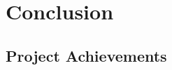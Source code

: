 \chapter{Conclusion}
\label{ch:conclusion}

\section{Project Achievements}
\label{sec:conclusion-achievements}

